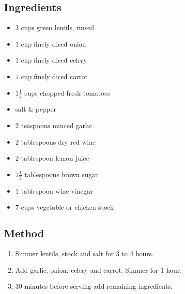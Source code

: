 \documentclass[11pt,a4paper]{article}
\begin{document}
\subsection*{Ingredients}

\begin{multicols}{2}

\begin{itemize}
  \item $ 3 $ cups green lentils, rinsed
  \item $ 1 $ cup finely diced onion
  \item $ 1 $ cup finely diced celery
  \item $ 1 $ cup finely diced carrot
  \item $ 1 \frac {1}{2} $ cups chopped fresh tomatoes
\end{itemize}

\columnbreak

\begin{itemize}
  \item salt \& pepper
  \item $ 2 $ teaspoons minced garlic
  \item $ 2 $ tablespoons dry red wine
  \item $ 2 $ tablespoon lemon juice
  \item $ 1 \frac {1}{2} $ tablespoons brown sugar
  \item $ 1 $ tablespoon wine vinegar
  \item $ 7 $ cups vegetable or chicken stock
\end{itemize}

\end{multicols}

\medskip

\subsection*{Method}

\begin{enumerate}
  \item Simmer lentils, stock and salt for 3 to 4 hours.
  \item Add garlic, onion, celery and carrot.  Simmer for 1 hour.
  \item 30 minutes before serving add remaining ingredients.
\end{enumerate}
\end{document}
